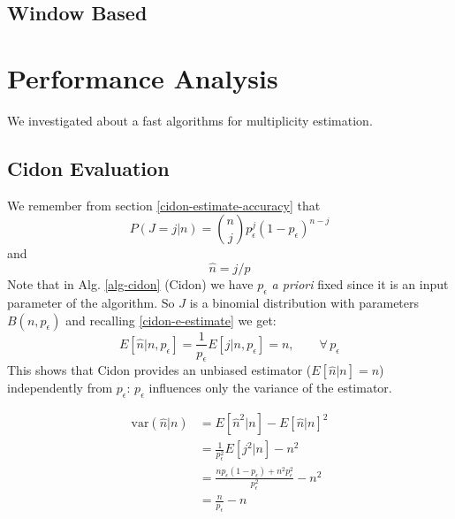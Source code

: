 \documentclass[12pt,a4paper]{report}
\newcommand{\pc}{p_{\epsilon}}
\begin{document}
\section{Window Based}
\chapter{Performance Analysis}
\label{ch:Performance Analysis}
We investigated about a fast algorithms for multiplicity estimation.\\

\section{Cidon Evaluation}

\begin{equation*}
\end{equation*}
We remember from section \ref{cidon-estimate-accuracy} that
\begin{equation*}P(J=j|n)={n \choose j}\pc^{j}(1-\pc)^{n-j}\end{equation*}
and
\begin{equation*}\hat{n}=j/p\end{equation*}
Note that  in Alg. \ref{alg-cidon} (Cidon) we have $\pc$ \emph{a priori} fixed since it is an input parameter of the algorithm. So $J$ is a binomial distribution with parameters $B(n,\pc)$ and recalling \eqref{cidon-e-estimate}
we get:
\begin{equation}
E[\hat{n}|n,\pc]=\frac{1}{\pc}E\left[j|n,\pc\right]=n, \qquad \forall \,\pc
\end{equation}
This shows that Cidon provides an unbiased estimator ($E[\hat{n}|n]=n$) independently from $\pc$: $\pc$ influences only the variance of the estimator. 

\begin{equation}
\begin{split}
\textrm{var}(\hat{n}|n) & =E[\hat{n}^{2}|n]- E[\hat{n}|n]^{2}\\
& = \frac{1}{\pc^{2}}E[j^{2}|n] - n^{2}\\
& = \frac{n\pc(1-\pc)+n^{2}\pc^{2}}{\pc^{2}}- n^{2}\\
& =  \frac{n}{\pc}-n
\end{split}
\end{equation}
\end{document}
